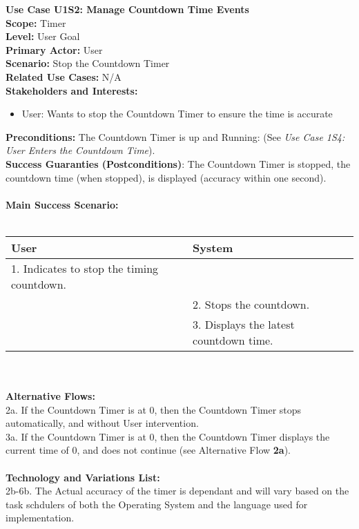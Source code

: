 \documentclass[letterpaper]{article}
\begin{document}
\noindent
\textbf{Use Case U1S2:  Manage Countdown Time Events}\\
\textbf{Scope:  }Timer\\
\textbf{Level:  }User Goal\\
\textbf{Primary Actor:  }User\\
\textbf{Scenario:  }Stop the Countdown Timer\\
\textbf{Related Use Cases:  }N/A\\
\textbf{Stakeholders and Interests:}
\begin{itemize}
\item User:  Wants to stop the Countdown Timer to ensure the time is accurate
\end{itemize}
\textbf{Preconditions:  }The Countdown Timer is up and Running:  (See
\textit{Use Case 1S4:  User Enters the Countdown Time}).\\
\textbf{Success Guaranties  (Postconditions)}: 
The Countdown Timer is stopped, the countdown time (when stopped), is displayed
(accuracy within one second).\\\\
\textbf{Main Success Scenario: }\\\\
\begin{tabular}{|p{6cm}|p{6cm}|}\hline
\textbf{User} & \textbf{System}\\\hline
1.  Indicates to stop the timing countdown. & \\\hline
&2.  Stops the countdown.\\\hline
&3.  Displays the latest countdown time.\\\hline
\end{tabular}\\\\
\textbf{Alternative Flows:  }\\
2a. If the Countdown Timer is at 0, then the Countdown Timer stops
automatically, and without User intervention.\\
3a. If the Countdown Timer is at 0, then the Countdown Timer displays
the current time of 0, and does not continue (see Alternative Flow
\textbf{2a}).\\\\
\textbf{Technology and Variations List:  }\\
2b-6b.  The Actual accuracy of the timer is dependant and
will vary based on the task schdulers of both the Operating
System and the language used for implementation.\\\\
\end{document}
